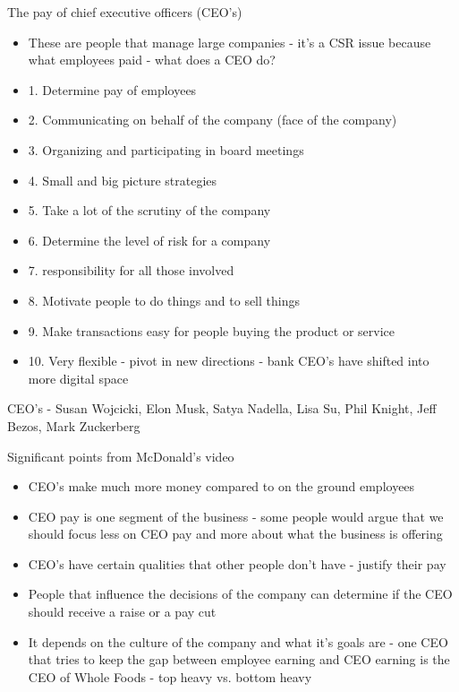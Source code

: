 \documentclass[11pt]{article}
\begin{document}
The pay of chief executive officers (CEO's)
\begin{itemize}
    \item These are people that manage large companies - it's a CSR issue because what employees paid - what does a CEO do? 
    \item 1. Determine pay of employees
    \item 2. Communicating on behalf of the company (face of the company)
    \item 3. Organizing and participating in board meetings
    \item 4. Small and big picture strategies
    \item 5. Take a lot of the scrutiny of the company
    \item 6. Determine the level of risk for a company
    \item 7. responsibility for all those involved
    \item 8. Motivate people to do things and to sell things
    \item 9. Make transactions easy for people buying the product or service
    \item 10. Very flexible - pivot in new directions - bank CEO's have shifted into more digital space
\end{itemize}

CEO's - Susan Wojcicki, Elon Musk, Satya Nadella, Lisa Su, Phil Knight, Jeff Bezos, Mark Zuckerberg

Significant points from McDonald's video

\begin{itemize}
    \item CEO's make much more money compared to on the ground employees
    \item CEO pay is one segment of the business - some people would argue that we should focus less on CEO pay and more about what the business is offering
    \item CEO's have certain qualities that other people don't have - justify their pay
    \item People that influence the decisions of the company can determine if the CEO should receive a raise or a pay cut
    \item It depends on the culture of the company and what it's goals are - one CEO that tries to keep the gap between employee earning and CEO earning is the CEO of Whole Foods - top heavy vs. bottom heavy
\end{itemize}
\end{document}
